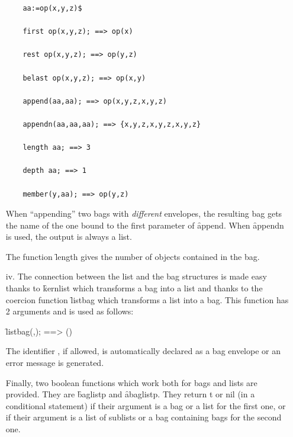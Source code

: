\begin{itemize}
\begin{verbatim}
    aa:=op(x,y,z)$

    first op(x,y,z); ==> op(x)

    rest op(x,y,z); ==> op(y,z)

    belast op(x,y,z); ==> op(x,y)

    append(aa,aa); ==> op(x,y,z,x,y,z)

    appendn(aa,aa,aa); ==> {x,y,z,x,y,z,x,y,z}

    length aa; ==> 3

    depth aa; ==> 1

    member(y,aa); ==> op(y,z)
\end{verbatim}
When ``appending'' two bags with \emph{different} envelopes, the resulting bag
gets the name of the one bound to the first parameter of \f{append}. When
\f{appendn} is used, the output is always a list.

The function \f{length} gives the number of objects contained in the
bag.
\item[iv.]
\hypertarget{operator:LISTBAG}{}
The connection between the list and the bag structures is made easy
thanks to \f{kernlist} which transforms a bag into a list and thanks to
the coercion function \f{listbag} which transforms a list into a bag.
This function has 2 arguments
and is used as follows:
\begin{syntax}
        \f{listbag}(,); ==> ()
\end{syntax}
The identifier , if allowed, is automatically declared as a bag
envelope or an error message is generated.

%
%
\hypertarget{operator:BAGLISTP}{}%
\hypertarget{operator:ABAGLISTP}{}%
Finally, two boolean functions which work both for bags and lists are
provided. They are \f{baglistp} and \f{abaglistp}.
They return t or nil (in a conditional statement) if their argument
is a bag or a list for the first one, or if their argument is a list of
sublists or a bag containing bags for the second one.
\end{itemize}
